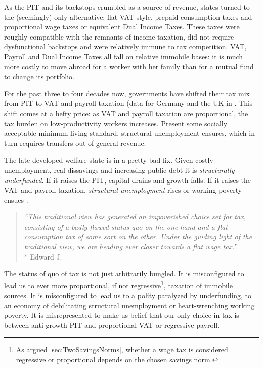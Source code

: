 As the PIT and its backstops crumbled as a source of revenue, states turned to the (seemingly) only alternative:
flat VAT-style, prepaid consumption taxes and proportional wage taxes or equivalent Dual Income Taxes.
These taxes were roughly compatible with the remnants of income taxation, did not require dysfunctional backstops and were relatively immune to tax competition.
VAT, Payroll and Dual Income Taxes all fall on relative immobile bases:
it is much more costly to move abroad for a worker with her family than for a mutual fund to change its portfolio.

For the past three to four decades now, governments have shifted their tax mix from PIT to VAT and payroll taxation (data for Germany and the UK in \citealt[11]{Kemmerling2009}.
This shift comes at a hefty price:
as VAT and payroll taxation are proportional, the tax burden on low-productivity workers increases.
Present some socially acceptable minimum living standard, structural unemployment ensures, which in turn requires transfers out of general revenue.

The late developed welfare state is in a pretty bad fix.
Given costly unemployment, real dissavings and increasing public debt it is \emph{structurally underfunded}.
If it raises the PIT, capital drains and growth falls.
If it raises the VAT and payroll taxation, \emph{structural unemployment} rises or working poverty ensues \citep{Kato2003}.

\begin{quote}
	\emph{``This traditional view has generated an impoverished choice set for tax, consisting of a badly flawed status quo on the one hand and a flat consumption tax of some sort on the other.
	Under the guiding light of the traditional view, we are heading ever closer towards a flat wage tax.''}
	\\*
	Edward J.\ \citet[812]{McCaffery2005}
\end{quote}

The status of quo of tax is not just arbitrarily bungled.
It is misconfigured to lead us to ever more proportional, if not regressive\footnote{As argued \autoref{sec:TwoSavingsNorms}, whether a wage tax is considered regressive or proportional depends on the chosen \hyperref[sec:TwoSavingsNorms]{savings norm}.}, taxation of immobile sources.
It is misconfigured to lead us to a polity paralyzed by underfunding, to an economy of debilitating structural unemployment or heart-wrenching working poverty.
It is misrepresented to make us belief that our only choice in tax is between anti-growth PIT and proportional VAT or regressive payroll.

